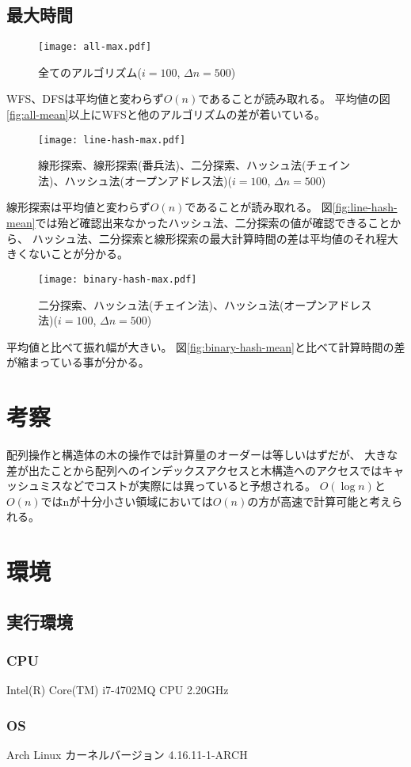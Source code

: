 \documentclass[dvipdfmx]{jsarticle}
\begin{document}
		\subsection{最大時間}
			\begin{figure}[H]
				\caption{全てのアルゴリズム($i = 100$, $\Delta n = 500$)}
				\texttt{[image: all-max.pdf]}
			\end{figure}
			WFS、DFSは平均値と変わらず$O(n)$であることが読み取れる。
			平均値の図\ref{fig:all-mean}以上にWFSと他のアルゴリズムの差が着いている。
			\begin{figure}[H]
				\caption{線形探索、線形探索(番兵法)、二分探索、ハッシュ法(チェイン法)、ハッシュ法(オープンアドレス法)($i = 100$, $\Delta n = 500$)}
				\texttt{[image: line-hash-max.pdf]}
			\end{figure}
			線形探索は平均値と変わらず$O(n)$であることが読み取れる。
			図\ref{fig:line-hash-mean}では殆ど確認出来なかったハッシュ法、二分探索の値が確認できることから、
			ハッシュ法、二分探索と線形探索の最大計算時間の差は平均値のそれ程大きくないことが分かる。
			\begin{figure}[H]
				\caption{二分探索、ハッシュ法(チェイン法)、ハッシュ法(オープンアドレス法)($i = 100$, $\Delta n = 500$)}
				\texttt{[image: binary-hash-max.pdf]}
			\end{figure}
			平均値と比べて振れ幅が大きい。
			図\ref{fig:binary-hash-mean}と比べて計算時間の差が縮まっている事が分かる。
	\section{考察}
		配列操作と構造体の木の操作では計算量のオーダーは等しいはずだが、
		大きな差が出たことから配列へのインデックスアクセスと木構造へのアクセスではキャッシュミスなどでコストが実際には異っていると予想される。
		$O(\log n)$と$O(n)$ではnが十分小さい領域においては$O(n)$の方が高速で計算可能と考えられる。
	\section{環境}
		\subsection{実行環境}
			\subsubsection{CPU}
				Intel(R) Core(TM) i7-4702MQ CPU 2.20GHz
			\subsubsection{OS}
				Arch Linux
				カーネルバージョン 4.16.11-1-ARCH
\end{document}
